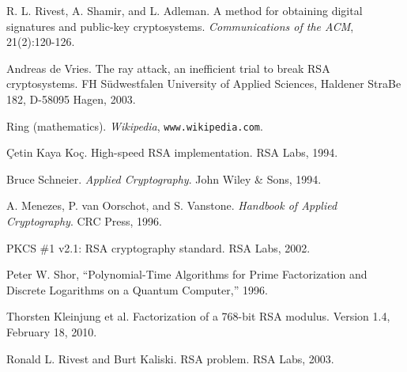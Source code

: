 
\begin{thebibliography}{99}

  R. L. Rivest, A. Shamir, and L. Adleman.
  A method for obtaining digital signatures and public-key cryptosystems.
  \emph{Communications of the ACM}, 21(2):120-126.

  Andreas de Vries.  The ray attack, an inefficient trial to break RSA cryptosystems.
  FH S\"udwestfalen University of Applied Sciences, Haldener StraBe 182, D-58095 Hagen, 2003.

  Ring (mathematics). \emph{Wikipedia}, \verb$www.wikipedia.com$.

  \c Cetin Kaya Ko\c c. High-speed RSA implementation. RSA Labs, 1994.

  Bruce Schneier. \emph{Applied Cryptography}. John Wiley \& Sons, 1994.

  A. Menezes, P. van Oorschot, and S. Vanstone.
  \emph{Handbook of Applied Cryptography}. CRC Press, 1996. 

  PKCS \#1 v2.1: RSA cryptography standard. RSA Labs, 2002.

  Peter W. Shor,
  ``Polynomial-Time Algorithms for Prime Factorization and 
  Discrete Logarithms on a Quantum Computer,'' 1996.

  Thorsten Kleinjung et al.
  Factorization of a 768-bit RSA modulus.
  Version 1.4, February 18, 2010.

  Ronald L. Rivest and Burt Kaliski. RSA problem.  RSA Labs, 2003.

\end{thebibliography}

